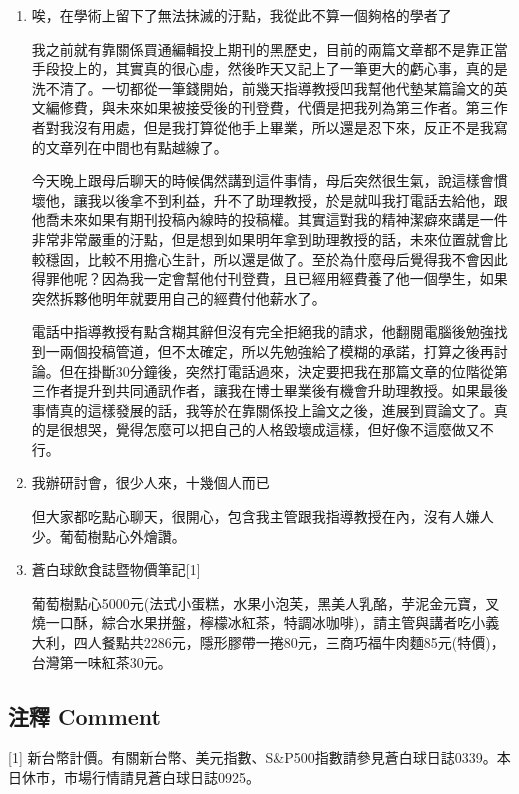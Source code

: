 \documentclass[a5paper, 11pt
]{book}
\begin{document}
\begin{enumerate}
\def\labelenumi{\arabic{enumi}.}
\item
  唉，在學術上留下了無法抹滅的汙點，我從此不算一個夠格的學者了

  我之前就有靠關係買通編輯投上期刊的黑歷史，目前的兩篇文章都不是靠正當手段投上的，其實真的很心虛，然後昨天又記上了一筆更大的虧心事，真的是洗不清了。一切都從一筆錢開始，前幾天指導教授凹我幫他代墊某篇論文的英文編修費，與未來如果被接受後的刊登費，代價是把我列為第三作者。第三作者對我沒有用處，但是我打算從他手上畢業，所以還是忍下來，反正不是我寫的文章列在中間也有點越線了。

  今天晚上跟母后聊天的時候偶然講到這件事情，母后突然很生氣，說這樣會慣壞他，讓我以後拿不到利益，升不了助理教授，於是就叫我打電話去給他，跟他喬未來如果有期刊投稿內線時的投稿權。其實這對我的精神潔癖來講是一件非常非常嚴重的汙點，但是想到如果明年拿到助理教授的話，未來位置就會比較穩固，比較不用擔心生計，所以還是做了。至於為什麼母后覺得我不會因此得罪他呢？因為我一定會幫他付刊登費，且已經用經費養了他一個學生，如果突然拆夥他明年就要用自己的經費付他薪水了。

  電話中指導教授有點含糊其辭但沒有完全拒絕我的請求，他翻閱電腦後勉強找到一兩個投稿管道，但不太確定，所以先勉強給了模糊的承諾，打算之後再討論。但在掛斷30分鐘後，突然打電話過來，決定要把我在那篇文章的位階從第三作者提升到共同通訊作者，讓我在博士畢業後有機會升助理教授。如果最後事情真的這樣發展的話，我等於在靠關係投上論文之後，進展到買論文了。真的是很想哭，覺得怎麼可以把自己的人格毀壞成這樣，但好像不這麼做又不行。
\item
  我辦研討會，很少人來，十幾個人而已

  但大家都吃點心聊天，很開心，包含我主管跟我指導教授在內，沒有人嫌人少。葡萄樹點心外燴讚。
\item
  蒼白球飲食誌暨物價筆記{[}1{]}

  葡萄樹點心5000元(法式小蛋糕，水果小泡芙，黑美人乳酪，芋泥金元寶，叉燒一口酥，綜合水果拼盤，檸檬冰紅茶，特調冰咖啡)，請主管與講者吃小義大利，四人餐點共2286元，隱形膠帶一捲80元，三商巧福牛肉麵85元(特價)，台灣第一味紅茶30元。
\end{enumerate}

\hypertarget{ux6ce8ux91cb-comment-25}{%
\subsection{注釋 Comment}\label{ux6ce8ux91cb-comment-25}}

{[}1{]}
新台幣計價。有關新台幣、美元指數、S\&P500指數請參見蒼白球日誌0339。本日休市，市場行情請見蒼白球日誌0925。
\end{document}
